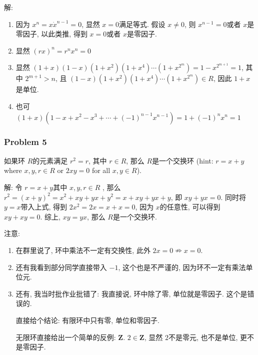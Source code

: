 \documentclass[a4paper,12pt]{ctexart}
\newcommand{\Z}{\mathbf{Z}}
\begin{document}
    解:\begin{enumerate}
      \item 因为 $ x^n=x\dot x^{n-1}=0 $, 显然 $ x=0 $满足等式. 假设 $ x\neq 0 $, 则 $ x^{n-1}=0 $或者
      $ x $是零因子, 以此类推, 得到 $ x=0 $或者 $ x $是零因子.
      \item 显然 $ (rx)^n=r^nx^n=0 $
      \item 显然 $ (1+x)(1-x)(1+x^2)(1+x^4)\cdots(1+x^{2^m})=1-x^{2^{m+1}}=1 $, 其中 $ 2^{m+1}>n $, 
      且 $ (1-x)(1+x^2)(1+x^4)\cdots(1+x^{2^m})\in R $, 因此 $ 1+x $是单位.
      \item 也可 $ (1+x)(1-x+x^2-x^3+\cdots+(-1)^{n-1}x^{n-1})=1+(-1)^nx^n=1 $
    \end{enumerate}
\subsubsection*{Problem 5}
    如果环 $ R $的元素满足 $ r^2=r $, 其中 $ r\in R $, 那么 $ R $是一个交换环 (hint: $ r=x+y $ where $ x,y,r\in R $ or $ 2xy=0 $ for all $ x,y\in R $).

    解: 令 $ r=x+y $其中 $ x,y,r\in R $ , 那么 $ r^2=(x+y)^2=x^2+xy+yx+y^2=x+xy+yx+y $, 即 $ xy+yx=0 $.
    同时将 $ y=x $带入上式, 得到 $ 2x^2=2x=x+x=0 $, 因为 $ x $的任意性, 可以得到 $ xy+xy=0 $.
    综上, $ xy=yx $, 那么 $ R $是一个交换环.

    注意:\begin{enumerate}
      \item 在群里说了, 环中乘法不一定有交换性, 此外 $ 2x=0\nRightarrow x=0 $. 
      \item 还有我看到部分同学直接带入 $ -1 $, 这个也是不严谨的, 因为环不一定有乘法单位元. 
      
      \item 还有, 我当时批作业批错了: 我直接说, 环中除了零, 单位就是零因子. 这个是错误的.
      
      直接给个结论: 有限环中只有零, 单位和零因子.
      
      无限环直接给出一个简单的反例: $ \Z $. $ 2\in\Z $, 显然 $ 2 $不是零元, 也不是单位, 更不是零因子.
    \end{enumerate} 

    
 
\end{document}
